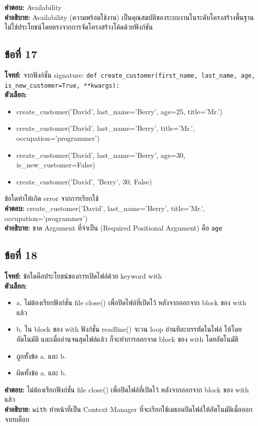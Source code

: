 \documentclass[12pt]{article}
\begin{document}
\textbf{คำตอบ:} Availability\\
\textbf{คำอธิบาย:} Availability (ความพร้อมใช้งาน) เป็นคุณสมบัติของระบบงานในระดับโครงสร้างพื้นฐาน ไม่ใช่ประโยชน์โดยตรงจากการจัดโครงสร้างโค้ดด้วยฟังก์ชัน

\subsection*{ข้อที่ 17}
\textbf{โจทย์:} จากฟังก์ชั่น signature: \texttt{def create\_customer(first\_name, last\_name, age, is\_new\_customer=True, **kwargs):}\\
\textbf{ตัวเลือก:}
\begin{itemize}
    \item create\_customer('David', last\_name='Berry', age=25, title='Mr.')
    \item create\_customer('David', last\_name='Berry', title='Mr.', occupation='programmer')
    \item create\_customer('David', last\_name='Berry', age=30, is\_new\_customer=False)
    \item create\_customer('David', 'Berry', 30, False)
\end{itemize}

ข้อใดทำให้เกิด error จากการเรียกใช้\\
\textbf{คำตอบ:} create\_customer('David', last\_name='Berry', title='Mr.', occupation='programmer')\\
\textbf{คำอธิบาย:} ขาด Argument ที่จำเป็น (Required Positional Argument) คือ \texttt{age}

\subsection*{ข้อที่ 18}
\textbf{โจทย์:} ข้อใดคือประโยชน์ของการเปิดไฟล์ด้วย keyword with\\
\textbf{ตัวเลือก:}
\begin{itemize}
    \item a. ไม่ต้องเรียกฟังก์ชั่น file close() เพื่อปิดไฟล์ที่เปิดไว้ หลังจากออกจาก block ของ with แล้ว
    \item b. ใน block ของ with ฟังก์ชั่น readline() จะวน loop อ่านทีละบรรทัดในไฟล์ ให้โดยอัตโนมัติ และเมื่ออ่านจนสุดไฟล์แล้ว ก็จะทำการออกจาด block ของ with โดยอัตโนมัติ
    \item ถูกทั้งข้อ a. และ b.
    \item ผิดทั้งข้อ a. และ b.
\end{itemize}

\textbf{คำตอบ:} ไม่ต้องเรียกฟังก์ชั่น file close() เพื่อปิดไฟล์ที่เปิดไว้ หลังจากออกจาก block ของ with แล้ว\\
\textbf{คำอธิบาย:} \texttt{with} ทำหน้าที่เป็น Context Manager ที่จะเรียกใช้เมธอดปิดไฟล์ให้อัตโนมัติเมื่อออกจากบล็อก
\end{document}
